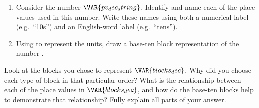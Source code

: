 
\begin{enumerate}
    \item Consider the number $\VAR{pv_dec_string}$. Identify and name each of the place values used in this number. Write these names using both a numerical label (e.g.\ ``10s'') and an English-word label (e.g.\ ``tens'').

    \vspace{20pt}
    \begin{ansenv}
    \end{ansenv}
    \vfill

    \item Using  to represent the units, draw a base-ten block representation of the number .

    \vspace{20pt}
    \begin{ansenv}
    \end{ansenv}
    \vfill
\end{enumerate}

\newpage


Look at the blocks you chose to represent $\VAR{blocks_dec}$. Why did you choose each type of block in that particular order? What is the relationship between each of the place values in $\VAR{blocks_dec}$, and how do the base-ten blocks help to demonstrate that relationship? Fully explain all parts of your answer.